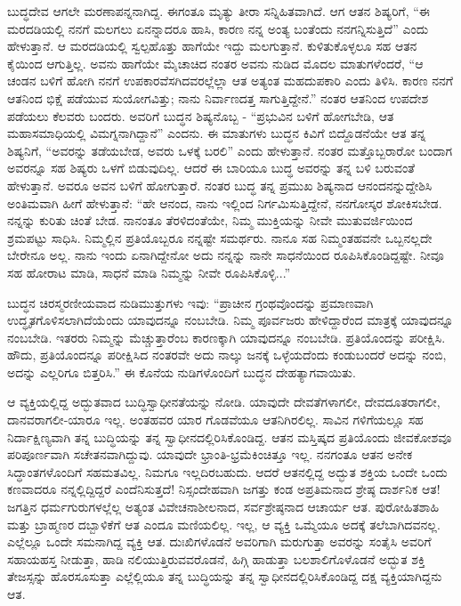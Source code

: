 ಬುದ್ಧದೇವ ಆಗಲೇ ಮರಣಾಪನ್ನನಾಗಿದ್ದ. ಈಗಂತೂ ಮೃತ್ಯು ತೀರಾ ಸನ್ನಿಹಿತವಾಗಿದೆ. ಆಗ ಆತನ ಶಿಷ್ಯರಿಗೆ, “ಈ ಮರದಡಿಯಲ್ಲಿ ನನಗೆ ಮಲಗಲು ಏನನ್ನಾದರೂ ಹಾಸಿ, ಕಾರಣ ನನ್ನ ಅಂತ್ಯ ಬಂತೆಂದು ನನಗನ್ನಿಸುತ್ತಿದೆ” ಎಂದು ಹೇಳುತ್ತಾನೆ. ಆ ಮರದಡಿಯಲ್ಲಿ ಸ್ವಲ್ಪಹೊತ್ತು ಹಾಗೆಯೇ ಇದ್ದು ಮಲಗುತ್ತಾನೆ. ಕುಳಿತುಕೊಳ್ಳಲೂ ಸಹ ಆತನ ಕೈಯಿಂದ ಆಗುತ್ತಿಲ್ಲ. ಅವನು ಹಾಗೆಯೇ ಮೈಚಾಚಿದ ನಂತರ ಅವನು ನುಡಿದ ಮೊದಲ ಮಾತುಗಳೆಂದರೆ, “ಆ ಚಂಡನ ಬಳಿಗೆ ಹೋಗಿ ನನಗೆ ಉಪಕಾರವೆಸಗಿದವರಲ್ಲೆಲ್ಲಾ ಆತ ಅತ್ಯಂತ ಮಹದುಪಕಾರಿ ಎಂದು ತಿಳಿಸಿ. ಕಾರಣ ನನಗೆ ಆತನಿಂದ ಭಿಕ್ಷೆ ಪಡೆಯುವ ಸುಯೋಗವಿತ್ತು; ನಾನು ನಿರ್ವಾಣದತ್ತ ಸಾಗುತ್ತಿದ್ದೇನೆ.” ನಂತರ ಆತನಿಂದ ಉಪದೇಶ ಪಡೆಯಲು ಕೆಲವರು ಬಂದರು. ಅವರಿಗೆ ಬುದ್ಧನ ಶಿಷ್ಯನೊಬ್ಬ - “ಪ್ರಭುವಿನ ಬಳಿಗೆ ಹೋಗಬೇಡಿ, ಆತ ಮಹಾಸಮಾಧಿಯಲ್ಲಿ ವಿಮಗ್ನನಾಗಿದ್ದಾನೆ” ಎಂದನು. ಈ ಮಾತುಗಳು ಬುದ್ಧನ ಕಿವಿಗೆ ಬಿದ್ದೊಡನೆಯೇ ಆತ ತನ್ನ ಶಿಷ್ಯನಿಗೆ, “ಅವರನ್ನು ತಡೆಯಬೇಡ, ಅವರು ಒಳಕ್ಕೆ ಬರಲಿ” ಎಂದು ಹೇಳುತ್ತಾನೆ. ನಂತರ ಮತ್ತೊಬ್ಬರಾರೋ ಬಂದಾಗ ಅವರನ್ನೂ ಸಹ ಶಿಷ್ಯರು ಒಳಗೆ ಬಿಡುವುದಿಲ್ಲ. ಆದರೆ ಈ ಬಾರಿಯೂ ಬುದ್ಧ ಅವರನ್ನು ತನ್ನ ಬಳಿ ಬರುವಂತೆ ಹೇಳುತ್ತಾನೆ. ಅವರೂ ಅವನ ಬಳಿಗೆ ಹೋಗುತ್ತಾರೆ. ನಂತರ ಬುದ್ಧ ತನ್ನ ಪ್ರಮುಖ ಶಿಷ್ಯನಾದ ಆನಂದನನ್ನುದ್ದೇಶಿಸಿ ಅಂತಿಮವಾಗಿ ಹೀಗೆ ಹೇಳುತ್ತಾನೆ: “ಹೇ ಆನಂದ, ನಾನು ಇಲ್ಲಿಂದ ನಿರ್ಗಮಿಸುತ್ತಿದ್ದೇನೆ, ನನಗೋಸ್ಕರ ಶೋಕಿಸಬೇಡ. ನನ್ನನ್ನು ಕುರಿತು ಚಿಂತೆ ಬೇಡ. ನಾನಂತೂ ತೆರಳಿದಂತೆಯೇ, ನಿಮ್ಮ ಮುಕ್ತಿಯನ್ನು ನೀವೇ ಮುತುವರ್ಜಿಯಿಂದ ಶ್ರಮಪಟ್ಟು ಸಾಧಿಸಿ. ನಿಮ್ಮಲ್ಲಿನ ಪ್ರತಿಯೊಬ್ಬರೂ ನನ್ನಷ್ಟೇ ಸಮರ್ಥರು. ನಾನೂ ಸಹ ನಿಮ್ಮಂತಹವನೇ ಒಬ್ಬನಲ್ಲದೇ ಬೇರೇನೂ ಅಲ್ಲ. ನಾನು ಇಂದು ಏನಾಗಿದ್ದೇನೋ ಅದು ನನ್ನನ್ನು ನಾನೇ ಸಾಧನೆಯಿಂದ ರೂಪಿಸಿಕೊಂಡಿದ್ದಷ್ಟೇ. ನೀವೂ ಸಹ ಹೋರಾಟ ಮಾಡಿ, ಸಾಧನೆ ಮಾಡಿ ನಿಮ್ಮನ್ನು ನೀವೇ ರೂಪಿಸಿಕೊಳ್ಳಿ...”

ಬುದ್ಧನ ಚಿರಸ್ಮರಣೀಯವಾದ ನುಡಿಮುತ್ತುಗಳು ಇವು: “ಪ್ರಾಚೀನ ಗ್ರಂಥವೊಂದನ್ನು ಪ್ರಮಾಣವಾಗಿ ಉದ್ಧೃತಗೊಳಿಸಲಾಗಿದೆಯೆಂದು ಯಾವುದನ್ನೂ ನಂಬಬೇಡಿ. ನಿಮ್ಮ ಪೂರ್ವಜರು ಹೇಳಿದ್ದಾರೆಂದ ಮಾತ್ರಕ್ಕೆ ಯಾವುದನ್ನೂ ನಂಬಬೇಡಿ. ಇತರರು ನಿಮ್ಮನ್ನು ಮೆಚ್ಚುತ್ತಾರೆಂಬ ಕಾರಣಕ್ಕಾಗಿ ಯಾವುದನ್ನೂ ನಂಬಬೇಡಿ. ಪ್ರತಿಯೊಂದನ್ನು ಪರೀಕ್ಷಿಸಿ. ಹೌದು, ಪ್ರತಿಯೊಂದನ್ನೂ ಪರೀಕ್ಷಿಸಿದ ನಂತರವೇ ಅದು ನಾಲ್ಕು ಜನಕ್ಕೆ ಒಳ್ಳೆಯದೆಂದು ಕಂಡುಬಂದರೆ ಅದನ್ನು ನಂಬಿ, ಅದನ್ನು ಎಲ್ಲರಿಗೂ ಬಿತ್ತರಿಸಿ.” ಈ ಕೊನೆಯ ನುಡಿಗಳೊಂದಿಗೆ ಬುದ್ಧನ ದೇಹತ್ಯಾಗವಾಯಿತು.

ಆ ವ್ಯಕ್ತಿಯಲ್ಲಿದ್ದ ಅದ್ಭುತವಾದ ಬುದ್ಧಿಸ್ವಾಧೀನತೆಯನ್ನು ನೋಡಿ. ಯಾವುದೇ ದೇವತೆಗಳಾಗಲೀ, ದೇವದೂತರಾಗಲೀ, ದಾನವರಾಗಲೀ-ಯಾರೂ ಇಲ್ಲ. ಅಂತಹವರ ಯಾರ ಗೊಡವೆಯೂ ಆತನಿಗಿರಲಿಲ್ಲ. ಸಾವಿನ ಗಳಿಗೆಯಲ್ಲೂ ಸಹ ನಿರ್ದಾಕ್ಷಿಣ್ಯವಾಗಿ ತನ್ನ ಬುದ್ಧಿಯನ್ನು ತನ್ನ ಸ್ವಾಧೀನದಲ್ಲಿರಿಸಿಕೊಂಡಿದ್ದ. ಆತನ ಮಸ್ತಿಷ್ಕದ ಪ್ರತಿಯೊಂದು ಜೀವಕೋಶವೂ ಪರಿಪೂರ್ಣವಾಗಿ ಸಚೇತನವಾಗಿದ್ದುವು. ಯಾವುದೇ ಭ್ರಾಂತಿ-ಭ್ರಮೆಕಿಂಚಿತ್ತೂ ಇಲ್ಲ. ನನಗಂತೂ ಆತನ ಅನೇಕ ಸಿದ್ಧಾಂತಗಳೊಂದಿಗೆ ಸಹಮತವಿಲ್ಲ. ನಿಮಗೂ ಇಲ್ಲದಿರಬಹುದು. ಆದರೆ ಆತನಲ್ಲಿದ್ದ ಅದ್ಭುತ ಶಕ್ತಿಯ ಒಂದೇ ಒಂದು ಕಣವಾದರೂ ನನ್ನಲ್ಲಿದ್ದಿದ್ದರೆ ಎಂದೆನಿಸುತ್ತದೆ! ನಿಸ್ಸಂದೇಹವಾಗಿ ಜಗತ್ತು ಕಂಡ ಅಪ್ರತಿಮನಾದ ಶ್ರೇಷ್ಠ ದಾರ್ಶನಿಕ ಆತ! ಜಗತ್ತಿನ ಧರ್ಮಗುರುಗಳಲ್ಲೆಲ್ಲ ಅತ್ಯಂತ ವಿವೇಚನಾಶೀಲನಾದ, ಸರ್ವಶ್ರೇಷ್ಠನಾದ ಆಚಾರ್ಯ ಆತ. ಪುರೋಹಿತಶಾಹಿ ಮತ್ತು ಬ್ರಾಹ್ಮಣರ ದಬ್ಬಾಳಿಕೆಗೆ ಆತ ಎಂದೂ ಮಣಿಯಲಿಲ್ಲ. ಇಲ್ಲ, ಆ ವ್ಯಕ್ತಿ ಒಮ್ಮೆಯೂ ಅದಕ್ಕೆ ತಲೆಬಾಗಿದವನಲ್ಲ. ಎಲ್ಲೆಲ್ಲೂ ಒಂದೇ ಸಮನಾಗಿದ್ದ ವ್ಯಕ್ತಿ ಆತ. ದುಃಖಿಗಳೊಡನೆ ಅವರಿಗಾಗಿ ಮರುಗುತ್ತಾ ಅವರನ್ನು ಸಂತೈಸಿ ಅವರಿಗೆ ಸಹಾಯಹಸ್ತ ನೀಡುತ್ತಾ, ಹಾಡಿ ನಲಿಯುತ್ತಿರುವವರೊಡನೆ, ಹಿಗ್ಗಿ ಹಾಡುತ್ತಾ ಬಲಶಾಲಿಗೊಳೊಡನೆ ಅದ್ಭುತ ಶಕ್ತಿ ತೇಜಸ್ಸನ್ನು ಹೊರಸೂಸುತ್ತಾ ಎಲ್ಲೆಲ್ಲಿಯೂ ತನ್ನ ಬುದ್ಧಿಯನ್ನು ತನ್ನ ಸ್ವಾಧೀನದಲ್ಲಿರಿಸಿಕೊಂಡಿದ್ದ ದಕ್ಷ ವ್ಯಕ್ತಿಯಾಗಿದ್ದನು ಆತ.

